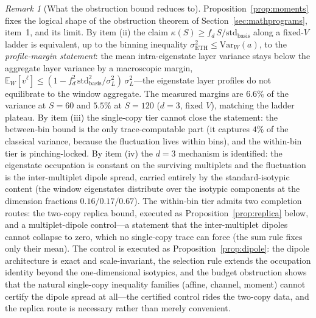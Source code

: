 \documentclass[11pt,a4paper]{article}
\theoremstyle{plain}
\theoremstyle{definition}
\theoremstyle{remark}
\newtheorem{remark}[theorem]{Remark}
\begin{document}
\begin{remark}[What the obstruction bound reduces to]\label{rem:obstruction}
Proposition~\ref{prop:moments} fixes the logical shape of the obstruction
theorem of Section~\ref{sec:mathprograms}, item~1, and its limit. By item
(ii) the claim $\kappa(S)\ge f_{d}\,S/\mathrm{std}_{\mathrm{basis}}$ along
a fixed-$V$ ladder is equivalent, up to the binning inequality
$\sigma_{\mathrm{ETH}}^{2}\le\mathrm{Var}_{W}(a)$, to the
\emph{profile-margin statement}:
the mean intra-eigenstate layer variance stays below the aggregate layer
variance by a macroscopic margin,
$\mathbb{E}_W[v^{\ell}]\le(1-f_{d}^{2}\,\mathrm{std}_{\mathrm{basis}}
^{2}/\sigma_L^{2})\,\sigma_L^{2}$---the eigenstate layer profiles do not
equilibrate to the window aggregate. The measured margins are $6.6\%$ of
the variance at $S=60$ and $5.5\%$ at $S=120$ ($d=3$, fixed $V$), matching
the ladder plateau. By item (iii) the single-copy tier cannot close the
statement: the between-bin bound is the only trace-computable part (it
captures $4\%$ of the classical variance, because the fluctuation lives
within bins), and the within-bin tier is pinching-locked. By item (iv) the
$d=3$ mechanism is identified: the eigenstate occupation is
constant on the surviving multiplets and the fluctuation is the
inter-multiplet dipole spread, carried entirely by the standard-isotypic
content (the window eigenstates distribute over the isotypic components
at the dimension fractions $0.16/0.17/0.67$). The within-bin tier admits
two completion routes: the two-copy replica bound, executed as
Proposition~\ref{prop:replica} below, and a multiplet-dipole
control---a statement that the inter-multiplet dipoles cannot collapse to
zero, which no single-copy trace can force (the sum rule fixes only their
mean). The control is executed as Proposition~\ref{prop:dipole}: the
dipole architecture is exact and scale-invariant, the selection rule
extends the occupation identity beyond the one-dimensional isotypics, and
the budget obstruction shows that the natural single-copy inequality
families (affine, channel, moment) cannot certify the dipole spread at
all---the certified control rides the two-copy data, and the replica route
is necessary rather than merely convenient.
\end{remark}
\end{document}
